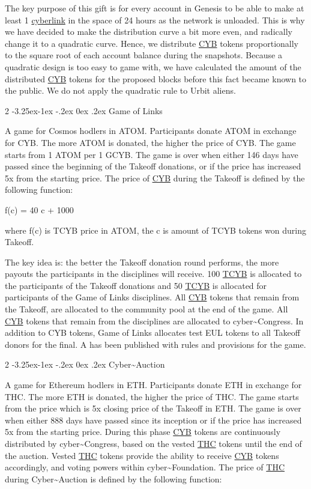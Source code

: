 \documentclass[8pt,oneside]{amsart}
\makeatletter
\newcommand{\linkred}[2]{\href{#1}{\color{red}{#2}}}
\renewcommand\subsection{\@startsection{subsection}
                                    {2}{\z@}
                                    {-3.25ex\@plus -1ex \@minus -.2ex}
                                    {0ex \@plus .2ex}
                                    {\play\Large}
                        }
\newcommand{\titleSection}[1]{\subsection{#1}}
\makeatother
\begin{document}
The key purpose of this gift is for every account in Genesis to be able to make at least 1 {\hyperref[cyberlinks]{cyberlink}} in the space of 24 hours as the network is unloaded. This is why we have decided to make the distribution curve a bit more even, and radically change it to a quadratic curve. Hence, we distribute {\hyperref[cyb]{CYB}} tokens proportionally to the square root of each account balance during the snapshots. Because a quadratic design is too easy to game with, we have calculated the amount of the distributed {\hyperref[cyb]{CYB}} tokens for the proposed blocks before this fact became known to the public. We do not apply the quadratic rule to Urbit aliens.

\titleSection{Game of Links}\label{gol}

A game for Cosmos hodlers in ATOM. Participants donate ATOM in exchange for CYB. The more ATOM is donated, the higher the price of CYB. The game starts from 1 ATOM per 1 GCYB. The game is over when either 146 days have passed since the beginning of the Takeoff donations, or if the price has increased 5x from the starting price. The price of {\hyperref[cyb]{CYB}} during the Takeoff is defined by the following function:

$$f(c) = 40 \cdot c + 1000

where f(c) is TCYB price in ATOM, the c is amount of TCYB tokens won during Takeoff.

The key idea is: the better the Takeoff donation round performs, the more payouts the participants in the disciplines will receive. 100 {\hyperref[cyb]{TCYB}} is allocated to the participants of the Takeoff donations and 50 {\hyperref[cyb]{TCYB}} is allocated for participants of the Game of Links disciplines. All {\hyperref[cyb]{CYB}} tokens that remain from the Takeoff, are allocated to the community pool at the end of the game. All {\hyperref[cyb]{CYB}} tokens that remain from the disciplines are allocated to cyber\~{}Congress. In addition to CYB tokens, Game of Links allocates test EUL tokens to all Takeoff donors for the final. A \linkred{https://cybercongress.ai/game-of-links/}{detailed document} has been published with rules and provisions for the game.

\titleSection{Cyber\~{}Auction}\label{cyber-auction}

A game for Ethereum hodlers in ETH. Participants donate ETH in exchange for THC. The more ETH is donated, the higher the price of THC. The game starts from the price which is 5x closing price of the Takeoff in ETH. The game is over when either 888 days have passed since its inception or if the price has increased 5x from the starting price. During this phase {\hyperref[cyb]{CYB}} tokens are continuously distributed by cyber\~{}Congress, based on the vested {\hyperref[thc]{THC}} tokens until the end of the auction. Vested {\hyperref[thc]{THC}} tokens provide the ability to receive {\hyperref[cyb]{CYB}} tokens accordingly, and voting powers within cyber\~{}Foundation. The price of {\hyperref[thc]{THC}} during Cyber\~{}Auction is defined by the following function:
\end{document}

